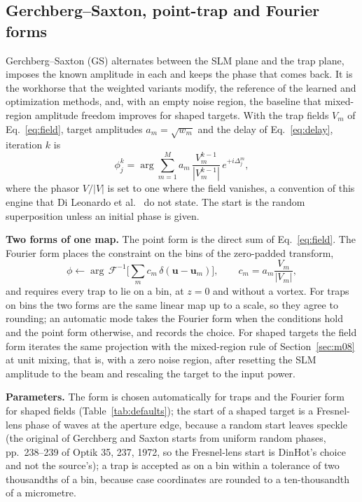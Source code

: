 \subsection{Gerchberg--Saxton, point-trap and Fourier forms}\label{sec:m04}

Gerchberg--Saxton (GS) alternates between the SLM plane and the trap plane, imposes the known amplitude in each and keeps the phase that comes back. It is the workhorse that the weighted variants modify, the reference of the learned and optimization methods, and, with an empty noise region, the baseline that mixed-region amplitude freedom improves for shaped targets. With the trap fields $V_m$ of Eq.~\eqref{eq:field}, target amplitudes $a_m=\sqrt{w_m}$ and the delay of Eq.~\eqref{eq:delay}, iteration $k$ is
\begin{equation}
\phi_j^{k}=\arg\sum_{m=1}^{M}a_m\,\frac{V_m^{k-1}}{|V_m^{k-1}|}\,e^{+i\Delta_j^m},
\label{eq:m04}
\end{equation}
where the phasor $V/|V|$ is set to one where the field vanishes, a convention of this engine that Di Leonardo et al.~\cite{dileonardo} do not state. The start is the random superposition unless an initial phase is given.

\textbf{Two forms of one map.} The point form is the direct sum of Eq.~\eqref{eq:field}. The Fourier form places the constraint on the bins of the zero-padded transform,
\begin{equation}
\phi\leftarrow\arg\,\mathcal F^{-1}\Big[\sum_{m}c_m\,\delta(\mathbf u-\mathbf u_m)\Big],\qquad c_m=a_m\frac{V_m}{|V_m|},
\label{eq:m04-fft}
\end{equation}
and requires every trap to lie on a bin, at $z=0$ and without a vortex. For traps on bins the two forms are the same linear map up to a scale, so they agree to rounding; an automatic mode takes the Fourier form when the conditions hold and the point form otherwise, and records the choice. For shaped targets the field form iterates the same projection with the mixed-region rule of Section~\ref{sec:m08} at unit mixing, that is, with a zero noise region, after resetting the SLM amplitude to the beam and rescaling the target to the input power.

\textbf{Parameters.} The form is chosen automatically for traps and the Fourier form for shaped fields (Table~\ref{tab:defaults}); the start of a shaped target is a Fresnel-lens phase of  waves at the aperture edge, because a random start leaves speckle (the original of Gerchberg and Saxton starts from uniform random phases, pp.~238--239 of Optik 35, 237, 1972, so the Fresnel-lens start is DinHot's choice and not the source's); a trap is accepted as on a bin within a tolerance of two thousandths of a bin, because case coordinates are rounded to a ten-thousandth of a micrometre.

